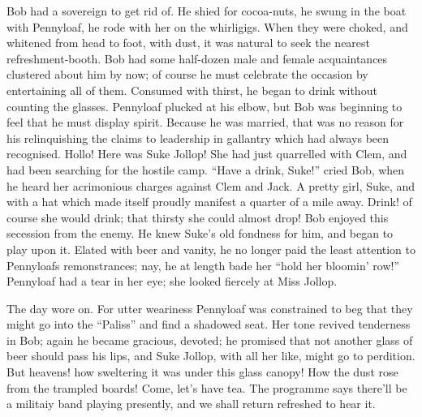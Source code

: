 Bob had a sovereign to get rid of. He shied for cocoa-nuts, he swung in
the boat with Pennyloaf, he rode with her on the whirligigs. When they
were choked, and whitened from head to foot, with dust, it was natural
to seek the nearest refreshment-booth. Bob had some half-dozen male and
female acquaintances clustered about him by now; of course he must
celebrate the occasion by entertaining all of them. Consumed with
thirst, he began to drink without counting the glasses. Pennyloaf
plucked at his elbow, but Bob was beginning to feel that he must display
spirit. Because he was married, that was no reason for his relinquishing
the claims to leadership in gallantry which had always been recognised.
Hollo! Here was Suke Jollop! She had just quarrelled with Clem, and had
been searching for the hostile camp.
{\protect\hypertarget{261}{}{}}``Have a drink, Suke!'' cried Bob, when
he heard her acrimonious charges against Clem and Jack. A pretty girl,
Suke, and with a hat which made itself proudly manifest a quarter of a
mile away. Drink! of course she would drink; that thirsty she could
almost drop! Bob enjoyed this secession from the enemy. He knew Suke's
old fondness for him, and began to play upon it. Elated with beer and
vanity, he no longer paid the least attention to Pennyloafs
remonstrances; nay, he at length bade her ``hold her bloomin' row!''
Pennyloaf had a tear in her eye; she looked fiercely at Miss Jollop.

The day wore on. For utter weariness Pennyloaf was constrained to beg
that they might go into the ``Paliss'' and find a shadowed seat. Her
tone revived tenderness in Bob; again he became gracious, devoted; he
promised that not another glass of beer should pass his lips, and Suke
Jollop, with all her like, might go to perdition. But heavens! how
sweltering it was under this glass canopy! How the dust rose from the
trampled boards! {\protect\hypertarget{262}{}{}}Come, let's have tea.
The programme says there'll be a militaiy band playing presently, and we
shall return refreshed to hear it.

